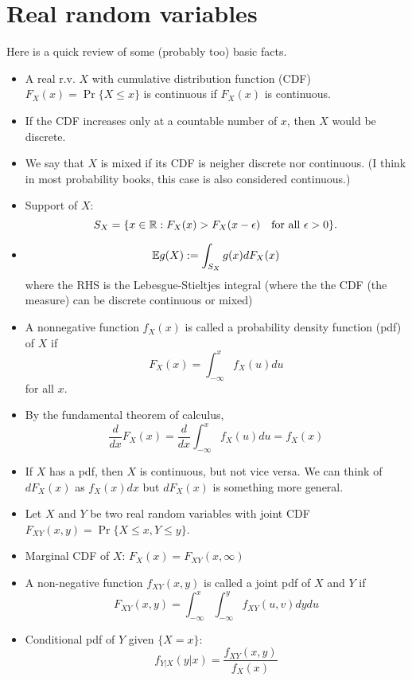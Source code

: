 \documentclass[../main.tex]{subfiles}
\begin{document}
\section{Real random variables}
Here is a quick review of some (probably too) basic facts.
\begin{itemize}
    \item A real r.v. $X$ with cumulative distribution function (CDF) $F_X(x)=\Pr\{X\leq x\}$ is continuous if $F_X(x)$ is continuous. 
    \item If the CDF increases only at a countable number of $x$, then $X$ would be discrete.
    \item We say that $X$ is mixed if its CDF is neigher discrete nor continuous. (I think in most probability books, this case is also considered continuous.)
    \item Support of $X$: \[
    S_X = \{x\in\mathbb{R}: F_X(x) > F_X(x-\epsilon)\quad \text{for all $\epsilon > 0$}\}.
    \]
    \item \[
    \mathbb{E} g(X) := \int_{S_X} g(x) dF_X(x)
    \] where the RHS is the Lebesgue-Stieltjes integral (where the the CDF (the measure) can be discrete continuous or mixed)
    \item A nonnegative function $f_X(x)$ is called a probability density function (pdf) of $X$ if \[
    F_X(x)=\int_{-\infty}^x f_X(u)du
    \] for all $x.$
    \item By the fundamental theorem of calculus, \[
    \frac{d}{dx}F_X(x) = \frac{d}{dx}\int_{-\infty}^xf_X(u)du=f_X(x)
    \]
    \item If $X$ has a pdf, then $X$ is continuous, but not vice versa. We can think of $dF_X(x)$ as $f_X(x)dx$ but $dF_X(x)$ is something more general.
\end{itemize}
\begin{itemize}
    \item Let $X$ and $Y$ be two real random variables with joint CDF $F_{XY}(x,y)=\Pr\{X\leq x, Y\leq y\}$.
    \item Marginal CDF of $X$: $F_X(x)=F_{XY}(x,\infty)$
    \item A non-negative function $f_{XY}(x,y)$ is called a joint pdf of $X$ and $Y$ if \[
    F_{XY}(x,y)=\int_{-\infty}^x\int_{-\infty}^y f_{XY}(u,v)dydu
    \]
    \item Conditional pdf of $Y$ given $\{X=x\}$:\[
    f_{Y|X}(y|x)=\frac{f_{XY}(x,y)}{f_X(x)}
    \]
\end{itemize}
\end{document}
